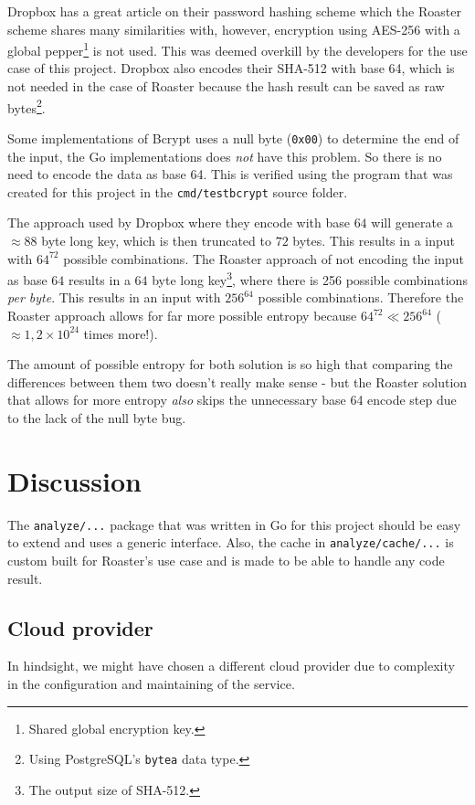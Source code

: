 \documentclass[12pt,a4paper]{report}
\begin{document}
Dropbox has a great article\cite{dropbox-passwords} on their password hashing scheme
which the Roaster scheme shares many similarities with, however, encryption using AES-256
with a global pepper\footnote{Shared global encryption key.} is not used. This was deemed overkill 
by the developers for the use case of this project. Dropbox also encodes their SHA-512 with base 64,
which is not needed in the case of Roaster because the hash result can be saved as raw
bytes\footnote{Using PostgreSQL's \texttt{bytea} data type.}.

Some implementations of Bcrypt uses a null byte (\texttt{0x00}) to determine the end
of the input\cite{bcrypt-bug}, the Go implementations does \textit{not} have this problem. So there
is no need to encode the data as base 64. This is verified using the program that was created for
this project in the \texttt{cmd/testbcrypt} source folder.

The approach used by Dropbox where they encode with base $64$ will generate a
$\approx 88$ byte long key, which is then truncated to $72$ bytes. This results in a
input with $64^{72}$ possible combinations. The Roaster approach of not encoding the
input as base $64$ results in a $64$ byte long key\footnote{The output size of SHA-512.},
where there is 256 possible combinations \textit{per byte}. This results in an input
with $256^{64}$ possible combinations. Therefore the Roaster approach allows for far more
possible entropy because $64^{72} \ll 256^{64}$ ($\approx 1,2 \times 10^{24}$ times more!).

The amount of possible entropy for both solution is so high that comparing the differences
between them two doesn't really make sense - but the Roaster solution that allows for more entropy
\textit{also} skips the unnecessary base 64 encode step due to the lack of the null byte bug.

\chapter{Discussion}
The \texttt{analyze/...} package that was written in Go for this project should be easy to extend and uses a generic interface. Also, the cache in \texttt{analyze/cache/...} is custom built for Roaster's use case and is made to be able to handle any code result.

\section{Cloud provider}
In hindsight, we might have chosen a different cloud provider due to complexity in the configuration and maintaining of the service. 
\end{document}
